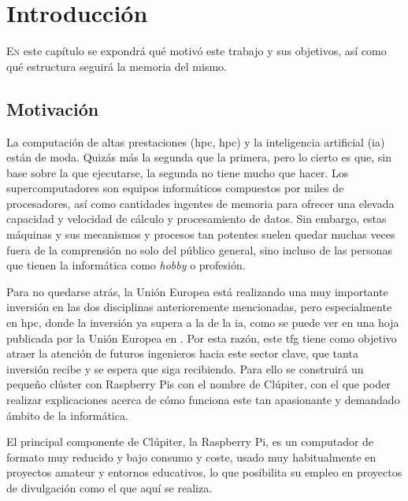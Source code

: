 \chapter{Introducción}
\label{chap:introducion}

\lettrine{E}{n} este capítulo se expondrá qué motivó este trabajo y sus objetivos, así como qué estructura seguirá la memoria del mismo.


\section{Motivación}
\label{sec:motivacion}

La computación de altas prestaciones (\acrshort{hpc}, \acrlong{hpc}) y la inteligencia artificial (\acrshort{ia}) están de moda. Quizás más la segunda que la primera, pero lo cierto es que, sin base sobre la que ejecutarse, la segunda no tiene mucho que hacer.
Los supercomputadores son equipos informáticos compuestos por miles de procesadores, así como cantidades ingentes de memoria para ofrecer una elevada capacidad y velocidad de cálculo y procesamiento de datos.
Sin embargo, estas máquinas y sus mecanismos y procesos tan potentes suelen quedar muchas veces fuera de la comprensión no solo del público general, sino incluso de las personas que tienen la informática como \textit{hobby} o profesión.

Para no quedarse atrás, la Unión Europea está realizando una muy importante inversión en las dos disciplinas anterioremente mencionadas, pero especialmente en \acrshort{hpc}, donde la inversión ya supera a la de la \acrshort{ia}, como se puede ver en una hoja publicada por la Unión Europea en \cite{eu_factsheet_digital}.
Por esta razón, este \acrshort{tfg} tiene como objetivo atraer la atención de futuros ingenieros hacia este sector clave, que tanta inversión recibe y se espera que siga recibiendo. Para ello se construirá un pequeño clúster con Raspberry Pis con el nombre de Clúpiter, con el que poder realizar explicaciones acerca de cómo funciona este tan apasionante y demandado ámbito de la informática.

El principal componente de Clúpiter, la Raspberry Pi, es un computador de formato muy reducido y bajo consumo y coste, usado muy habitualmente en proyectos amateur y entornos educativos, lo que posibilita su empleo en proyectos de divulgación como el que aquí se realiza.

